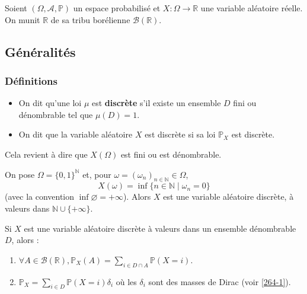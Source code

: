 




  Soient $(\Omega, \mathcal{A}, \mathbb{P})$ un espace probabilisé et $X : \Omega \rightarrow \mathbb{R}$ une variable aléatoire réelle. On munit $\mathbb{R}$ de sa tribu borélienne $\mathcal{B}(\mathbb{R})$.

  \subsection{Généralités}

  \subsubsection{Définitions}


  \begin{definition}
    \begin{itemize}
      \item On dit qu'une loi $\mu$ est \textbf{discrète} s'il existe un ensemble $D$ fini ou dénombrable tel que $\mu(D) = 1$.
      \item On dit que la variable aléatoire $X$ est discrète si sa loi $\mathbb{P}_X$ est discrète.
    \end{itemize}
  \end{definition}


  \begin{remark}
    Cela revient à dire que $X(\Omega)$ est fini ou est dénombrable.
  \end{remark}

  \begin{example}
    On pose $\Omega=\{0,1\}^{\mathbb{N}}$ et, pour $\omega=(\omega_n)_{n\in\mathbb{N}}\in\Omega$,
    \[ X(\omega)=\inf\{n\in\mathbb{N}\mid \omega_n=0\} \]
    (avec la convention $\inf\varnothing=+\infty$). Alors $X$ est une variable aléatoire discrète, à valeurs dans $\mathbb{N}\cup\{+\infty\}$.
  \end{example}


  \begin{proposition}
    Si $X$ est une variable aléatoire discrète à valeurs dans un ensemble dénombrable $D$, alors :
    \begin{enumerate}[label={\bfseries(\roman*)}]
      \item $\forall A \in \mathcal{B}(\mathbb{R}), \mathbb{P}_X(A) = \sum_{i \in D \cap A} \mathbb{P}(X=i)$.
      \item $\mathbb{P}_X = \sum_{i \in D} \mathbb{P}(X=i) \delta_i$ où les $\delta_i$ sont des masses de Dirac (voir \cref{264-1}).
    \end{enumerate}
  \end{proposition}

